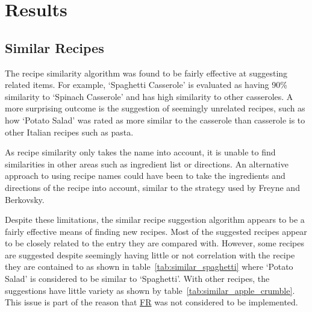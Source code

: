 \section{Results}

\subsection{Similar Recipes}

The recipe similarity algorithm was found to be fairly effective at suggesting related items.
For example, \enquote*{Spaghetti Casserole} is evaluated as having 90\% similarity to
\enquote*{Spinach Casserole} and has high similarity to other casseroles. A more surprising
outcome is the suggestion of seemingly unrelated recipes, such as how \enquote*{Potato Salad}
was rated as more similar to the casserole than casserole is to other Italian recipes such as
pasta.

As recipe similarity only takes the name into account, it is unable to find similarities
in other areas such as ingredient list or directions. An alternative approach to using
recipe names could have been to take the ingredients and directions of the recipe into account,
similar to the strategy used by Freyne and Berkovsky.~\cite{freyne_intelligent_2010}

Despite these limitations, the similar recipe suggestion algorithm appears to be a fairly effective
means of finding new recipes. Most of the suggested recipes appear to be closely related to the entry they are
compared with. However, some recipes are suggested despite seemingly having little or not correlation with the
recipe they are contained to as shown in table~\ref{tab:similar_spaghetti} where \enquote*{Potato Salad} is considered
to be similar to \enquote*{Spaghetti}. With other recipes, the suggestions have little variety as shown by
table~\ref{tab:similar_apple_crumble}. This issue is part of the reason that
\hyperref[req:too_similar]{FR} was not considered to be implemented.

